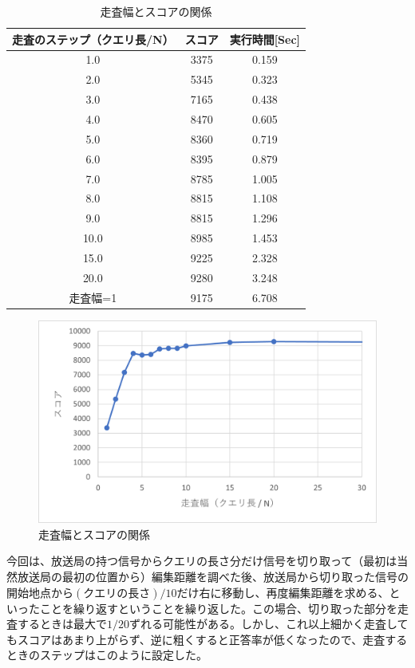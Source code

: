 \documentclass[dvipdfmx]{jsarticle}
\begin{document}
\begin{table}[H]
  \centering
  \begin{tabular}{c|c|c}
    走査のステップ（クエリ長/N） & スコア & 実行時間[Sec] \\ \hline\hline
    1.0 & 3375 & 0.159 \\ \hline
    2.0 & 5345 & 0.323 \\ \hline
    3.0 & 7165 & 0.438 \\ \hline
    4.0 & 8470 & 0.605 \\ \hline
    5.0 & 8360 & 0.719 \\ \hline
    6.0 & 8395 & 0.879 \\ \hline
    7.0 & 8785 & 1.005 \\ \hline
    8.0 & 8815 & 1.108 \\ \hline
    9.0 & 8815 & 1.296 \\ \hline
    10.0 & 8985 & 1.453 \\ \hline
    15.0 & 9225 & 2.328 \\ \hline
    20.0 & 9280 & 3.248 \\ \hline
    走査幅=1 & 9175 & 6.708 \\ \hline
  \end{tabular}
  \caption{走査幅とスコアの関係}
\end{table}

\begin{figure}[H]
  \centering
  \includegraphics[scale = 1.0]{step.png}
  \caption{走査幅とスコアの関係}
\end{figure}

今回は、放送局の持つ信号からクエリの長さ分だけ信号を切り取って（最初は当然放送局の最初の位置から）編集距離を調べた後、放送局から切り取った信号の開始地点から$(クエリの長さ)/10$だけ右に移動し、再度編集距離を求める、といったことを繰り返すということを繰り返した。この場合、切り取った部分を走査するときは最大で$1/20$ずれる可能性がある。しかし、これ以上細かく走査してもスコアはあまり上がらず、逆に粗くすると正答率が低くなったので、走査するときのステップはこのように設定した。
\end{document}

